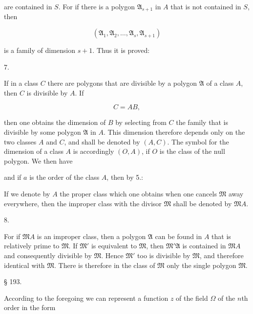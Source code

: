 
are contained in $S$. For if there is a polygon $\mathfrak{A}_{s+1}$ in $A$
that is not contained in $S$, then

\[
(\mathfrak{A}_1, \mathfrak{A}_2, \ldots, \mathfrak{A}_s, \mathfrak{A}_{s+1})
\]

is a family of dimension $s+1$. Thus it is proved:

7. 

If in a class $C$ there are polygons that are divisible by a
polygon $\mathfrak{A}$ of a class $A$, then $C$ is divisible by $A$.
If

\[
C = AB,
\]

then one obtains the dimension of $B$ by selecting from $C$ the
family that is divisible by some polygon $\mathfrak{A}$ in $A$. This
dimension therefore depends only on the two classes $A$ and $C$,
and shall be denoted by $(A, C)$. The symbol for the dimension of
a class $A$ is accordingly $(O, A)$, if $O$ is the class of the
null polygon. We then have


and if $a$ is the order of the class $A$, then by 5.:


If we denote by $A$ the proper class which one obtains
when one cancels $\mathfrak{M}$ away everywhere, then the improper class
with the divisor $\mathfrak{M}$ shall be denoted by $\mathfrak{M}A$.

8. 

For if $\mathfrak{M}A$ is an improper class, then a polygon $\mathfrak{A}$
can be found in $A$ that is relatively prime to $\mathfrak{M}$. If $\mathfrak{M}'$ is
equivalent to $\mathfrak{M}$, then $\mathfrak{M}'\mathfrak{A}$ is contained in $\mathfrak{M}A$ and consequently
divisible by $\mathfrak{M}$. Hence $\mathfrak{M}'$ too is divisible by $\mathfrak{M}$, and therefore
identical with $\mathfrak{M}$. There is therefore in the class of $\mathfrak{M}$ only the
single polygon $\mathfrak{M}$.

\begin{center}
§ 193. 
\end{center}

According to the foregoing we can represent a function $z$ of the field
$\Omega$ of the $n$th order in the form


